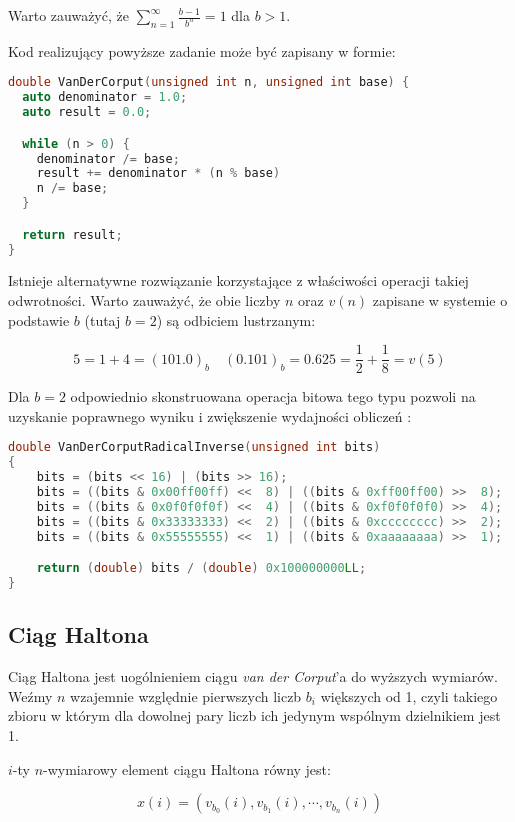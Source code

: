 \documentclass[../main.tex]{subfiles}
\begin{document}
Warto zauważyć, że $\sum_{n=1}^{\infty} \frac{b-1}{b^n} = 1$ dla $b>1$.

Kod realizujący powyższe zadanie może być zapisany w formie:

\begin{lstlisting}[language=c++]
double VanDerCorput(unsigned int n, unsigned int base) {
  auto denominator = 1.0;
  auto result = 0.0;

  while (n > 0) {
    denominator /= base;
    result += denominator * (n % base)
    n /= base;
  }

  return result;
}
\end{lstlisting}

Istnieje alternatywne rozwiązanie korzystające z właściwości operacji takiej
odwrotności. Warto zauważyć, że obie liczby $n$ oraz $v(n)$ zapisane w systemie
o podstawie $b$ (tutaj $b=2$) są odbiciem lustrzanym:

\[
  5 = 1 + 4 = (101.0)_{b} \quad
  (0.101)_{b} = 0.625 = \frac{1}{2} + \frac{1}{8} = v(5)
\]

Dla $b=2$ odpowiednio skonstruowana operacja bitowa tego typu pozwoli na
uzyskanie poprawnego wyniku i zwiększenie wydajności obliczeń
\cite{dammertz_2012}\cite{MultidimensionalSampling}:

\begin{lstlisting}[language=c++]
double VanDerCorputRadicalInverse(unsigned int bits)
{
	bits = (bits << 16) | (bits >> 16);
	bits = ((bits & 0x00ff00ff) <<  8) | ((bits & 0xff00ff00) >>  8);
	bits = ((bits & 0x0f0f0f0f) <<  4) | ((bits & 0xf0f0f0f0) >>  4);
	bits = ((bits & 0x33333333) <<  2) | ((bits & 0xcccccccc) >>  2);
	bits = ((bits & 0x55555555) <<  1) | ((bits & 0xaaaaaaaa) >>  1);

	return (double) bits / (double) 0x100000000LL;
}
\end{lstlisting}

\subsection{Ciąg Haltona}

Ciąg Haltona jest uogólnieniem ciągu \textit{van der Corput}'a do wyższych
wymiarów. Weźmy $n$ wzajemnie względnie pierwszych liczb $b_i$ większych od 1,
czyli takiego zbioru w którym dla dowolnej pary liczb ich jedynym wspólnym
dzielnikiem jest 1.

$i$-ty $n$-wymiarowy element ciągu Haltona równy jest:

\[ x(i) = \left( v_{b_0}(i), v_{b_1}(i), \cdots, v_{b_n}(i) \right) \]
\end{document}
